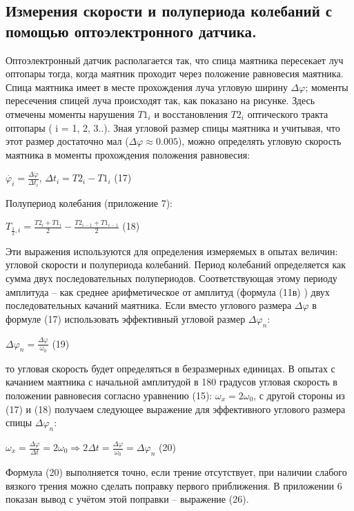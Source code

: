 \documentclass[a4paper]{article}
\begin{document}
\subsection{Измерения скорости и полупериода колебаний с помощью оптоэлектронного датчика.}
Оптоэлектронный датчик располагается так, что спица маятника пересекает луч оптопары тогда, когда маятник проходит через положение
равновесия маятника. Спица маятника имеет в месте прохождения луча угловую ширину $\Delta\varphi$; моменты пересечения спицей луча происходят
так, как показано на рисунке. Здесь отмечены моменты нарушения $T1_i$
и восстановления $T2_i$ оптического тракта оптопары ( i = 1, 2, 3..).
Зная угловой размер спицы маятника и учитывая, что этот размер
достаточно мал ($\Delta\varphi \approx 0.005$), можно определять угловую скорость
маятника в моменты прохождения положения равновесия:
\begin{center}$\dot{\varphi_i}=\frac{\Delta \varphi}{\Delta t_i}$, \space $\Delta t_i=T2_i-T1_i$ (17)\end{center}
Полупериод колебания (приложение 7):
\begin{center}$T_{\frac{1}{2}, i} = \frac{T2_i+T1_i}{2}-\frac{T2_{i-1}+T1_{i-1}}{2}$ (18)\end{center}
Эти выражения используются для определения измеряемых в опытах
величин: угловой скорости и полупериода колебаний. Период колебаний
определяется как сумма двух последовательных полупериодов. Соответствующая этому периоду амплитуда – как среднее арифметическое от амплитуд (формула (11в) ) двух последовательных качаний маятника. Если вместо углового размера $\Delta\varphi$ в формуле (17) использовать эффективный угловой размер $\Delta\varphi_n$:
\begin{center}$\Delta\varphi_n=\frac{\Delta\varphi}{\omega_0}$ (19)\end{center}
то угловая скорость будет определяться в безразмерных единицах. В опытах с качанием маятника с начальной амплитудой в 180 градусов угловая скорость в положении равновесия согласно уравнению (15): $\omega_x=2\omega_0$, с другой стороны из (17) и (18) получаем следующее выражение для эффективного углового размера спицы $\Delta\varphi_n$:
\begin{center}$\omega_x=\frac{\Delta\varphi}{\Delta t}=2\omega_0 \Rightarrow 2\Delta t =\frac{\Delta \varphi}{\omega_0}=\Delta \varphi_n$ (20)\end{center}
Формула (20) выполняется точно, если трение отсутствует, при наличии
слабого вязкого трения можно сделать поправку первого приближения.
В приложении 6 показан вывод с учётом этой поправки – выражение
(26).
\end{document}
